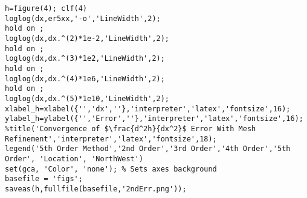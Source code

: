 \begin{verbatim}
h=figure(4); clf(4)
loglog(dx,er5xx,'-o','LineWidth',2);
hold on ;
loglog(dx,dx.^(2)*1e-2,'LineWidth',2);
hold on ;
loglog(dx,dx.^(3)*1e2,'LineWidth',2);
hold on ;
loglog(dx,dx.^(4)*1e6,'LineWidth',2);
hold on ;
loglog(dx,dx.^(5)*1e10,'LineWidth',2);
xlabel_h=xlabel({'','dx',''},'interpreter','latex','fontsize',16);
ylabel_h=ylabel({'','Error',''},'interpreter','latex','fontsize',16);
%title('Convergence of $\frac{d^2h}{dx^2}$ Error With Mesh Refinement','interpreter','latex','fontsize',18);
legend('5th Order Method','2nd Order','3rd Order','4th Order','5th Order', 'Location', 'NorthWest')
set(gca, 'Color', 'none'); % Sets axes background
basefile = 'figs';
saveas(h,fullfile(basefile,'2ndErr.png'));
\end{verbatim}

